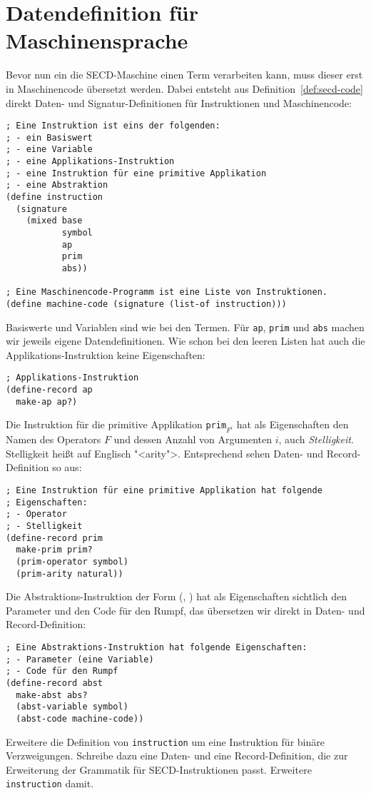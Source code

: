 \section{Datendefinition für Maschinensprache}
% 
Bevor nun ein die SECD-Maschine einen Term verarbeiten kann, muss
dieser erst in Maschinencode übersetzt werden.  Dabei entsteht aus
Definition~\ref{def:secd-code} direkt Daten- und Signatur-Definitionen
für Instruktionen und Maschinencode:
%
\begin{lstlisting}
; Eine Instruktion ist eins der folgenden:
; - ein Basiswert
; - eine Variable
; - eine Applikations-Instruktion
; - eine Instruktion für eine primitive Applikation
; - eine Abstraktion
(define instruction
  (signature
    (mixed base
           symbol
           ap
           prim
           abs))

; Eine Maschinencode-Programm ist eine Liste von Instruktionen.
(define machine-code (signature (list-of instruction)))
\end{lstlisting}
%
Basiswerte und Variablen sind wie bei den Termen.
Für \lstinline{ap}, \lstinline{prim} und \lstinline{abs} machen wir
jeweils eigene Datendefinitionen.
Wie schon bei den leeren Listen hat auch die Applikations-Instruktion
keine Eigenschaften:
%
\begin{lstlisting}
; Applikations-Instruktion
(define-record ap
  make-ap ap?)
\end{lstlisting}
%
Die Instruktion für die primitive Applikation \texttt{prim}$_{F^i}$
hat als Eigenschaften den Namen des Operators $F$ und dessen Anzahl
von Argumenten $i$, auch \textit{Stelligkeit}.
Stelligkeit heißt auf Englisch "<arity">.  Entsprechend sehen Daten-
und Record-Definition so aus:
%
\begin{lstlisting}
; Eine Instruktion für eine primitive Applikation hat folgende
; Eigenschaften:
; - Operator
; - Stelligkeit
(define-record prim
  make-prim prim?
  (prim-operator symbol)
  (prim-arity natural))
\end{lstlisting}
%
Die Abstraktions-Instruktion der Form (, ) hat als
Eigenschaften sichtlich den Parameter und den Code für den Rumpf,
das übersetzen wir direkt in Daten- und Record-Definition:
%
\begin{lstlisting}
; Eine Abstraktions-Instruktion hat folgende Eigenschaften:
; - Parameter (eine Variable)
; - Code für den Rumpf
(define-record abst
  make-abst abs?
  (abst-variable symbol)
  (abst-code machine-code))
\end{lstlisting}
%
\begin{aufgabeinline}
  Erweitere die Definition von \lstinline{instruction} um eine
  Instruktion für binäre Verzweigungen.  Schreibe dazu eine Daten- und
  eine Record-Definition, die zur Erweiterung der Grammatik für
  SECD-Instruktionen passt.  Erweitere \lstinline{instruction} damit.
\end{aufgabeinline}

